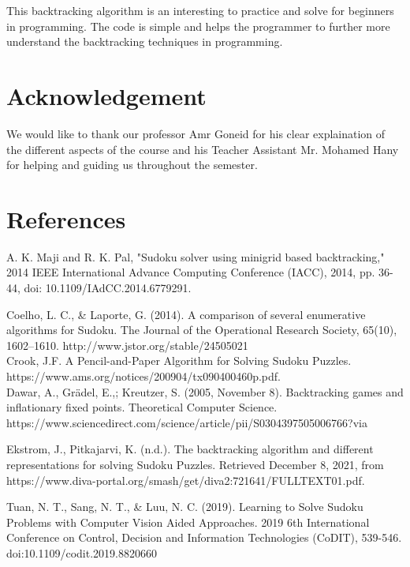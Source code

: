 \documentclass[12pt]{extarticle}
\theoremstyle{plain}
\begin{document}
This backtracking algorithm is an interesting to practice and solve for beginners in programming. The code is simple and helps the programmer to further more understand the backtracking techniques in programming.

\section*{Acknowledgement}
We would like to thank our professor Amr Goneid for his clear explaination of the different aspects of the course and his Teacher Assistant Mr. Mohamed Hany for helping and guiding us throughout the semester.
\newpage
\section*{References}
A. K. Maji and R. K. Pal, "Sudoku solver using minigrid based backtracking," 2014 IEEE International Advance Computing Conference (IACC), 2014, pp. 36-44, doi: 10.1109/IAdCC.2014.6779291.

Coelho, L. C., \& Laporte, G. (2014). A comparison of several enumerative algorithms for Sudoku. The Journal of the Operational Research Society, 65(10), 1602–1610. http://www.jstor.org/stable/24505021\\

Crook, J.F. A Pencil-and-Paper Algorithm for Solving Sudoku Puzzles. https://www.ams.org/notices/200904/tx090400460p.pdf.\\

Dawar, A., Grädel, E.,; Kreutzer, S. (2005, November 8). Backtracking games and inflationary fixed points. Theoretical Computer Science. https://www.sciencedirect.com/science/article/pii/S0304397505006766?via%

Ekstrom, J., Pitkajarvi, K. (n.d.). The backtracking algorithm and different representations for solving Sudoku Puzzles. Retrieved December 8, 2021, from https://www.diva-portal.org/smash/get/diva2:721641/FULLTEXT01.pdf.

Tuan, N. T., Sang, N. T., \& Luu, N. C. (2019). Learning to Solve Sudoku Problems with Computer Vision Aided Approaches. 2019 6th International Conference on Control, Decision and Information Technologies (CoDIT), 539-546. doi:10.1109/codit.2019.8820660
\end{document}
